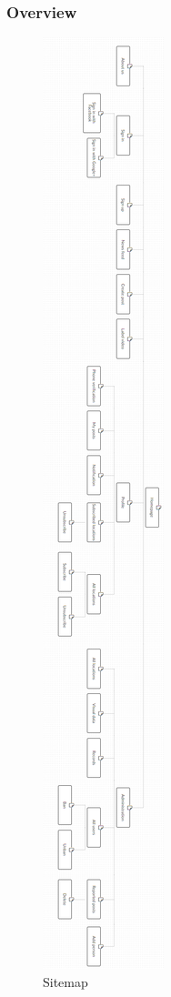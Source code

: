 \subsubsection{Overview}
\begin{center}
    \begin{figure}[H]
    \centering
    \includegraphics[width=0.16\columnwidth]{images/chap4/sitemap.png}
    \caption{Sitemap}
    \end{figure}
\end{center}
